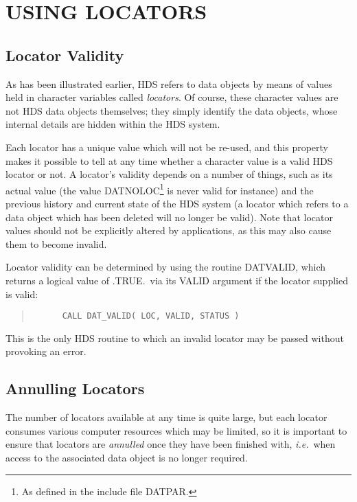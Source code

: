 \documentclass[twoside,11pt]{article}
\newcommand{\htmlref}[2]{#1}
\newcommand{\xlabel}[1]{}
\renewcommand{\_}{\texttt{\symbol{95}}}
\newcommand{\st}[1]{{\em{#1}}}
\begin{document}
\section{\xlabel{using_locators}\label{sect:locators}USING LOCATORS}

\subsection{\xlabel{locator_validity}Locator Validity}

As has been illustrated \htmlref{earlier}{sect:creating}, HDS
refers to data objects by means of values held in character variables
called \st{locators}.  Of course, these character values are not HDS
data objects themselves; they simply identify the data objects, whose
internal details are hidden within the HDS system.

Each locator has a unique value which will not be re-used, and this
property makes it possible to tell at any time whether a character
value is a valid HDS locator or not.  A locator's validity depends on
a number of things, such as its actual value (the value
DAT\_\_NOLOC\footnote{As defined in the include file DAT\_PAR.} is
never valid for instance) and the previous history and current state
of the HDS system (a locator which refers to a data object which has
been deleted will no longer be valid).  Note that locator values
should not be explicitly altered by applications, as this may also
cause them to become invalid.

Locator validity can be determined by using the routine
\htmlref{DAT\_VALID}{DAT_VALID}, which returns a logical value of
.TRUE.\ via its VALID argument if the locator supplied is valid:

\small
\begin{quote}
\begin{verbatim}
      CALL DAT_VALID( LOC, VALID, STATUS )
\end{verbatim}
\end{quote}
\normalsize

This is the only HDS routine to which an invalid locator may be passed
without provoking an error.

\subsection{\xlabel{annulling_locators}\label{sect:annul}Annulling Locators}

The number of locators available at any time is quite large, but each
locator consumes various computer resources which may be limited, so
it is important to ensure that locators are \st{annulled\/} once they
have been finished with, \st{i.e.}\ when access to the associated
data object is no longer required.
\end{document}
